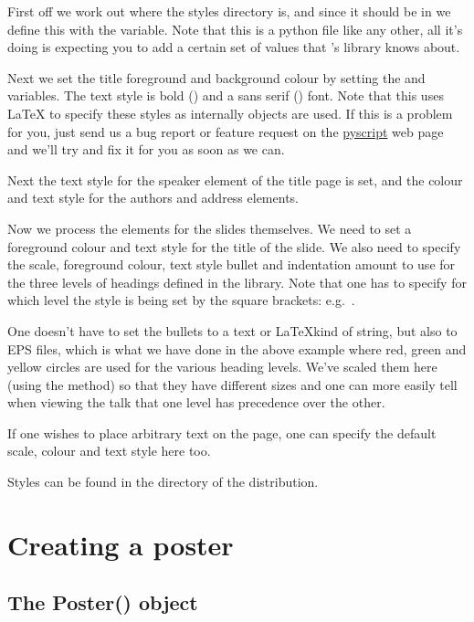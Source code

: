 First off we work out where the styles directory is, and since it should be
in  we define this with the 
variable.  Note that this is a python file like any other, all it's doing is
expecting you to add a certain set of values that \pyscript's
 library knows about.  

Next we set the title foreground and background colour by setting the
 and  variables.  The text style is bold
(\ttt{\\bf}) and a sans serif (\ttt{\\sf}) font.  Note that this uses
\LaTeX{} to specify these styles as internally \pyscript {} objects
are used.  If this is a problem for you, just send us a bug report or
feature request on the \href{http://pyscript.sf.net}{pyscript} web page and
we'll try and fix it for you as soon as we can.

Next the text style for the speaker element of the title page is set, and
the colour and text style for the authors and address elements.

Now we process the elements for the slides themselves.  We need to set a
foreground colour and text style for the title of the slide.  We also need
to specify the scale, foreground colour, text style bullet and indentation
amount to use for the three levels of headings defined in the
 library.  Note that one has to specify for which level
the style is being set by the square brackets: e.g.~.  

One doesn't have to set the bullets to a text or \LaTeX kind of string, but
also to EPS files, which is what we have done in the above example where
red, green and yellow circles are used for the various heading levels.
We've scaled them here (using the \pyscript {} method) so that they
have different sizes and one can more easily tell when viewing the talk that
one level has precedence over the other.

If one wishes to place arbitrary text on the page, one can specify the
default scale, colour and text style here too.

Styles can be found in the  directory of the \pyscript
distribution.

\section{Creating a poster}

\subsection{The Poster() object}

